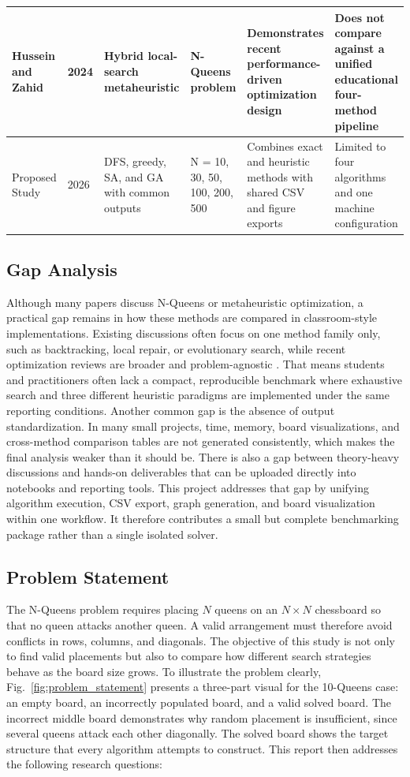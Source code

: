 \documentclass[conference]{IEEEtran}
\begin{document}
\begin{table}[!ht]
\begin{tabular}{|p{2.9cm}|p{0.9cm}|p{2.0cm}|p{2.4cm}|p{2.4cm}|p{3.6cm}|}
Hussein and Zahid~\cite{hussein2024nmra} & 2024 & Hybrid local-search metaheuristic & N-Queens problem & Demonstrates recent performance-driven optimization design & Does not compare against a unified educational four-method pipeline \\ \hline
Proposed Study & 2026 & DFS, greedy, SA, and GA with common outputs & N = 10, 30, 50, 100, 200, 500 & Combines exact and heuristic methods with shared CSV and figure exports & Limited to four algorithms and one machine configuration \\ \hline
\end{tabular}
\end{table}

\subsection{Gap Analysis}
Although many papers discuss N-Queens or metaheuristic optimization, a practical gap remains in how these methods are compared in classroom-style implementations. Existing discussions often focus on one method family only, such as backtracking, local repair, or evolutionary search, while recent optimization reviews are broader and problem-agnostic \cite{houssein2024metaheuristics,salgotra2024systematic,rashed2024advancements}. That means students and practitioners often lack a compact, reproducible benchmark where exhaustive search and three different heuristic paradigms are implemented under the same reporting conditions. Another common gap is the absence of output standardization. In many small projects, time, memory, board visualizations, and cross-method comparison tables are not generated consistently, which makes the final analysis weaker than it should be. There is also a gap between theory-heavy discussions and hands-on deliverables that can be uploaded directly into notebooks and reporting tools. This project addresses that gap by unifying algorithm execution, CSV export, graph generation, and board visualization within one workflow. It therefore contributes a small but complete benchmarking package rather than a single isolated solver.

\subsection{Problem Statement}
The N-Queens problem requires placing $N$ queens on an $N \times N$ chessboard so that no queen attacks another queen. A valid arrangement must therefore avoid conflicts in rows, columns, and diagonals. The objective of this study is not only to find valid placements but also to compare how different search strategies behave as the board size grows. To illustrate the problem clearly, Fig.~\ref{fig:problem_statement} presents a three-part visual for the 10-Queens case: an empty board, an incorrectly populated board, and a valid solved board. The incorrect middle board demonstrates why random placement is insufficient, since several queens attack each other diagonally. The solved board shows the target structure that every algorithm attempts to construct. This report then addresses the following research questions:
\end{document}
